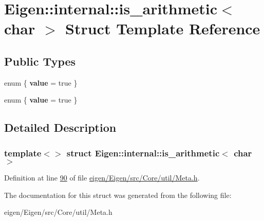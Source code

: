 \hypertarget{struct_eigen_1_1internal_1_1is__arithmetic_3_01char_01_4}{}\section{Eigen\+:\+:internal\+:\+:is\+\_\+arithmetic$<$ char $>$ Struct Template Reference}
\label{struct_eigen_1_1internal_1_1is__arithmetic_3_01char_01_4}
\subsection*{Public Types}
\begin{DoxyCompactItemize}
\item 
\mbox{\label{struct_eigen_1_1internal_1_1is__arithmetic_3_01char_01_4_ae27dad84a39a198da83a69c157f1708e}} 
enum \{ {\bfseries value} = true
 \}
\item 
\mbox{\label{struct_eigen_1_1internal_1_1is__arithmetic_3_01char_01_4_aec43be1b52f1c78ce0db1654ea24d2e6}} 
enum \{ {\bfseries value} = true
 \}
\end{DoxyCompactItemize}


\subsection{Detailed Description}
\subsubsection*{template$<$$>$\newline
struct Eigen\+::internal\+::is\+\_\+arithmetic$<$ char $>$}



Definition at line \hyperlink{eigen_2_eigen_2src_2_core_2util_2_meta_8h_source_l00090}{90} of file \hyperlink{eigen_2_eigen_2src_2_core_2util_2_meta_8h_source}{eigen/\+Eigen/src/\+Core/util/\+Meta.\+h}.



The documentation for this struct was generated from the following file\+:\begin{DoxyCompactItemize}
\item 
eigen/\+Eigen/src/\+Core/util/\+Meta.\+h\end{DoxyCompactItemize}
